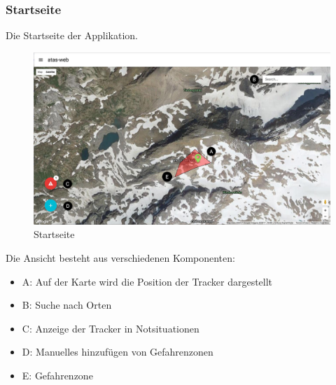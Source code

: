 \documentclass[11pt,english,german]{report}
\theoremstyle{definition}
\begin{document}
\subsubsection{Startseite}
Die Startseite der Applikation.
\begin{figure}[H]
	\centering
	\includegraphics[width=\textwidth]{img/atasweb/atas-web.jpg}
	\caption[Startseite]
	{Startseite}
\end{figure}
Die Ansicht besteht aus verschiedenen Komponenten:
\begin{itemize}
	\item A: Auf der Karte wird die Position der Tracker dargestellt
	\item B: Suche nach Orten
	\item C: Anzeige der Tracker in Notsituationen
	\item D: Manuelles hinzufügen von Gefahrenzonen
	\item E: Gefahrenzone
\end{itemize}

\newpage
\end{document}
